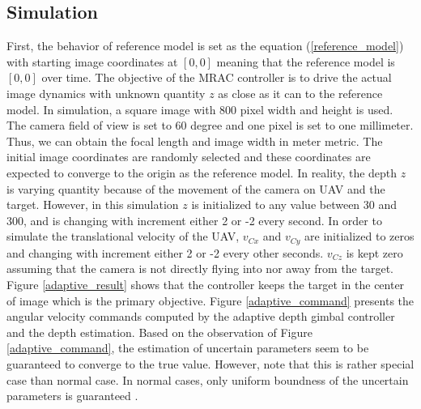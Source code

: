 \subsection{Simulation}
First, the behavior of reference model is set as the equation (\ref{reference_model}) with starting image coordinates at $[0, 0]$ meaning that the reference model is $[0, 0]$ over time. The objective of the MRAC controller is to drive the actual image dynamics with unknown quantity $z$ as close as it can to the reference model. In simulation, a square image with 800 pixel width and height is used. The camera field of view is set to 60 degree and one pixel is set to one millimeter. Thus, we can obtain the focal length and image width in meter metric. The initial image coordinates are randomly selected and these coordinates are expected to converge to the origin as the reference model. In reality, the depth $z$ is varying quantity because of the movement of the camera on UAV and the target. However, in this simulation $z$ is initialized to any value between 30 and 300, and is changing with increment either 2 or -2 every second. In order to simulate the translational velocity of the UAV, $v_{Cx}$ and $v_{Cy}$ are initialized to zeros and changing with increment either 2 or -2 every other seconds. $v_{Cz}$ is kept zero assuming that the camera is not directly flying into nor away from the target. Figure \ref{adaptive_result} shows that the controller keeps the target in the center of image which is the primary objective. Figure \ref{adaptive_command} presents the angular velocity commands computed by the adaptive depth gimbal controller and the depth estimation. Based on the observation of Figure \ref{adaptive_command}, the estimation of uncertain parameters seem to be guaranteed to converge to the true value. However, note that this is rather special case than normal case. In normal cases, only uniform boundness of the uncertain parameters is guaranteed \cite{Lavretsky2013}. 
